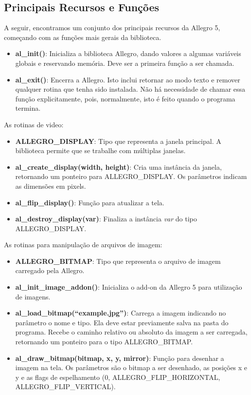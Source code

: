 \subsection{Principais Recursos e Funções}
%
A seguir, encontramos um conjunto dos principais recursos da Allegro 5, começando com
as funções mais gerais da biblioteca.
%
\begin{itemize}
 \item \textbf{al\_init()}: Inicializa a biblioteca Allegro, dando valores a algumas variáveis globais e reservando memória. 
 Deve ser a primeira função a ser chamada.
 \item \textbf{al\_exit()}: Encerra a Allegro. Isto inclui retornar ao modo texto e remover qualquer rotina que tenha sido instalada. 
 Não há necessidade de chamar essa função explicitamente, pois, normalmente, isto é feito quando o programa termina.
\end{itemize}
%
As rotinas de video:
%
\begin{itemize}
 \item \textbf{ALLEGRO\_DISPLAY}: Tipo que representa a janela principal. A biblioteca permite que se trabalhe com múltiplas janelas.
 \item \textbf{al\_create\_display(width, height)}: Cria uma instância da janela, retornando um ponteiro para ALLEGRO\_DISPLAY. 
 Os parâmetros indicam as dimensões em pixels.
 \item \textbf{al\_flip\_display()}: Função para atualizar a tela.
 \item \textbf{al\_destroy\_display(var)}: Finaliza a instância \textit{var} do tipo ALLEGRO\_DISPLAY\*.
\end{itemize}
%
As rotinas para manipulação de arquivos de imagem:
%
\begin{itemize}
 \item \textbf{ALLEGRO\_BITMAP}: Tipo que representa o arquivo de imagem carregado pela Allegro.
 \item \textbf{al\_init\_image\_addon()}: Inicializa o add-on da Allegro 5 para utilização de imagens.
 \item \textbf{al\_load\_bitmap(``example.jpg'')}: Carrega a imagem indicando no parâmetro o nome e tipo. Ela deve estar previamente salva na pasta 
 do programa. Recebe o caminho relativo ou absoluto da imagem a ser carregada, retornando um ponteiro para o tipo ALLEGRO\_BITMAP.
 \item \textbf{al\_draw\_bitmap(bitmap, x, y, mirror)}: Função para desenhar a imagem na tela. Os parâmetros são o bitmap a ser desenhado, as 
 posições x e y e as flags de espelhamento (0, ALLEGRO\_FLIP\_HORIZONTAL, ALLEGRO\_FLIP\_VERTICAL).
\end{itemize}
